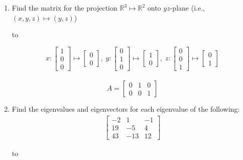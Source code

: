 \documentclass[11pt]{article}
\newcommand{\hdotrule}[1]{\hbox to \textwidth{\leaders\hbox to #1pt{\hss . \hss}\hfil}}
\begin{document}
\begin{preview}
\begin{enumerate}
            \item Find the matrix for the projection $\mathbb{R}^3 \mapsto \mathbb{R}^2$ onto $yz$-plane (i.e., $(x,y,z) \mapsto (y,z)$)
            
            \hdotrule{5}

                  $$
                        x: \begin{bmatrix}1\\0\\0\end{bmatrix} \mapsto \begin{bmatrix}0\\0\end{bmatrix}, \; 
                        y: \begin{bmatrix}0\\1\\0\end{bmatrix} \mapsto \begin{bmatrix}1\\0\end{bmatrix}, \; 
                        z: \begin{bmatrix}0\\0\\1\end{bmatrix} \mapsto \begin{bmatrix}0\\1\end{bmatrix}
                  $$\\
                  $$A = \begin{bmatrix}0&1&0\\0&0&1\end{bmatrix}$$ 
            
            \item Find the eigenvalues and eigenvectors for each eigenvalue of the following: 
            \begin{align*}
                  \begin{bmatrix}-2&1&-1\\ 19&-5&4\\ 43&-13&12\end{bmatrix}
            \end{align*}

            \hdotrule{5}


\end{enumerate}
\end{preview}
\end{document}
